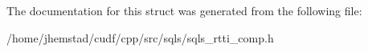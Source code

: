 The documentation for this struct was generated from the following file\+:\begin{DoxyCompactItemize}
\item 
/home/jhemstad/cudf/cpp/src/sqls/sqls\+\_\+rtti\+\_\+comp.\+h\end{DoxyCompactItemize}
